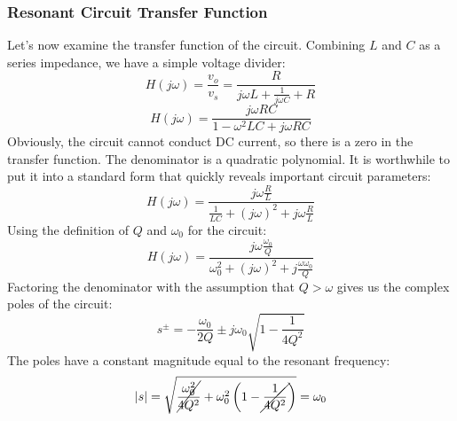 \subsubsection{Resonant Circuit Transfer Function}
Let's now examine the transfer function of the circuit.  Combining $L$ and $C$ as a series impedance, we have a simple voltage divider:
\begin{equation}
    H(j\omega) = \frac{v_o}{v_s} = \frac{R}{j\omega L + \frac{1}{j\omega C} +
      R}
\end{equation}
\begin{equation}
    H(j\omega) = \frac{j\omega R C }{1 - \omega^2 LC + j\omega R C}
\end{equation}
Obviously, the circuit cannot conduct DC current, so there is a zero in the transfer function.  The denominator is a quadratic polynomial.  It is worthwhile to put it into a standard form that quickly reveals important circuit parameters:
    \begin{equation}
        H(j\omega) = \frac{j\omega \frac{R}{L} }{\frac{1}{LC} + (j\omega)^2 + j\omega \frac{R}{L}}
    \end{equation}
Using the definition of $Q$ and $\omega_0$ for the circuit:
    \begin{equation}
        H(j\omega) = \frac{j\omega \frac{\omega_0}{Q} }{\omega_0^2 +  (j\omega)^2 + j \frac{\omega\omega_0}{Q}}
    \end{equation}
Factoring the denominator with the assumption that $Q > \omega$ gives us the complex poles of the circuit:
    \begin{equation}
        s^\pm = -\frac{\omega_0}{2 Q} \pm j\omega_0 \sqrt{1 - \frac{1}{4Q^2}}
    \end{equation}
The poles have a constant magnitude equal to the resonant frequency:
    \begin{equation}
        |s| = \sqrt{\cancel{\frac{\omega_0^2}{4 Q^2}} + \omega_0^2 \left(1 - \cancel{\frac{1}{4Q^2}} \right)} = \omega_0
    \end{equation}

